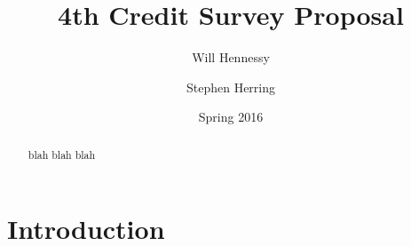 \documentclass[11pt]{article}
\title{4th Credit Survey Proposal}
\author{Will Hennessy \and Stephen Herring}
\date{Spring 2016}
\begin{document}
\maketitle

\begin{abstract}
blah blah blah
\end{abstract}

\section{Introduction}


%



\end{document}
